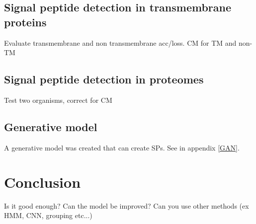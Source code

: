 \subsection{Signal peptide detection in transmembrane proteins}
Evaluate transmembrane and non transmembrane acc/loss.
CM for TM and non-TM

\subsection{Signal peptide detection in proteomes}
Test two organisms, correct for CM

\subsection{Generative model}
A generative model was created that can create SPs. See in appendix \ref{GAN}.


\section{Conclusion}

Is it good enough? Can the model be improved? Can you use other methods (ex HMM, CNN, grouping etc...)


